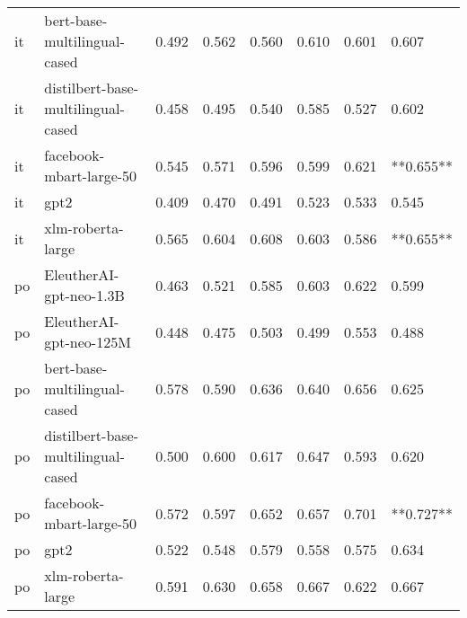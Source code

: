 \begin{tabular}{llllllll}
      it &       bert-base-multilingual-cased & 0.492 &                     0.562 &                 0.560 &                  0.610 &                                   0.601 &     0.607 \\
      it & distilbert-base-multilingual-cased & 0.458 &                     0.495 &                 0.540 &                  0.585 &                                   0.527 &     0.602 \\
      it &            facebook-mbart-large-50 & 0.545 &                     0.571 &                 0.596 &                  0.599 &                                   0.621 & **0.655** \\
      it &                               gpt2 & 0.409 &                     0.470 &                 0.491 &                  0.523 &                                   0.533 &     0.545 \\
      it &                  xlm-roberta-large & 0.565 &                     0.604 &                 0.608 &                  0.603 &                                   0.586 & **0.655** \\
      po &            EleutherAI-gpt-neo-1.3B & 0.463 &                     0.521 &                 0.585 &                  0.603 &                                   0.622 &     0.599 \\
      po &            EleutherAI-gpt-neo-125M & 0.448 &                     0.475 &                 0.503 &                  0.499 &                                   0.553 &     0.488 \\
      po &       bert-base-multilingual-cased & 0.578 &                     0.590 &                 0.636 &                  0.640 &                                   0.656 &     0.625 \\
      po & distilbert-base-multilingual-cased & 0.500 &                     0.600 &                 0.617 &                  0.647 &                                   0.593 &     0.620 \\
      po &            facebook-mbart-large-50 & 0.572 &                     0.597 &                 0.652 &                  0.657 &                                   0.701 & **0.727** \\
      po &                               gpt2 & 0.522 &                     0.548 &                 0.579 &                  0.558 &                                   0.575 &     0.634 \\
      po &                  xlm-roberta-large & 0.591 &                     0.630 &                 0.658 &                  0.667 &                                   0.622 &     0.667 \\

\end{tabular}
